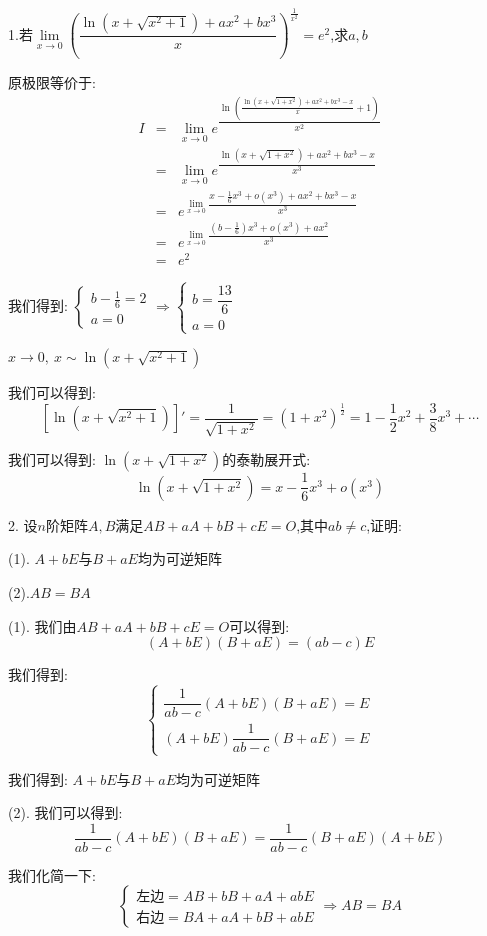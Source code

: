 1.若$\lim\limits_{x\rightarrow 0}\left(\dfrac{\ln(x+\sqrt{x^2+1})+ax^2+bx^3}{x} \right)^{\frac{1}{x^2}}=e^2$,求$a,b$
\begin{solution}
	
	原极限等价于: 
	\begin{eqnarray*}
		I&=&\lim\limits_{x\rightarrow 0}e^{\dfrac{\ln(\frac{\ln(x+\sqrt{1+x^2})+ax^2+bx^3-x}{x}+1)}{x^2}}\\
		&=&\lim\limits_{x\rightarrow 0}e^{\dfrac{\ln(x+\sqrt{1+x^2})+ax^2+bx^3-x}{x^3}}\\
		&=&e^{\lim\limits_{x\rightarrow 0}\dfrac{x-\frac{1}{6}x^3+o(x^3)+ax^2+bx^3-x}{x^3}}\\
		&=&e^{\lim\limits_{x\rightarrow 0}\dfrac{(b-\frac{1}{6})x^3+o(x^3)+ax^2}{x^3}}\\
		&=&e^2
	\end{eqnarray*}
	
	我们得到: $\left\lbrace
	\begin{array}{l}
		b-\frac{1}{6}=2\\
		a=0
	\end{array}
	\right. \Rightarrow \left\lbrace
	\begin{array}{l}
		b=\dfrac{13}{6}\\
		a=0
	\end{array}
	\right. $
\end{solution}
\begin{anymark}[注]
	$x\rightarrow 0,\ x\sim \ln(x+\sqrt{x^2+1})$
	
	我们可以得到: 
	$$[\ln(x+\sqrt{x^2+1})]'=\dfrac{1}{\sqrt{1+x^2}}=(1+x^2)^{\frac{1}{2}}=1-\dfrac{1}{2}x^2+\dfrac{3}{8}x^3+\cdots$$
	
	我们可以得到: $\ln(x+\sqrt{1+x^2})$的泰勒展开式: 
	$$\ln(x+\sqrt{1+x^2})=x-\dfrac{1}{6}x^3+o(x^3)$$
\end{anymark}

2. 设$n$阶矩阵$A,B$满足$AB+aA+bB+cE=O$,其中$ab\neq c$,证明: 

(1). $A+bE$与$B+aE$均为可逆矩阵 

(2).$AB=BA$
\begin{solution}
	
	(1). 我们由$AB+aA+bB+cE=O$可以得到: 
	$$(A+bE)(B+aE)=(ab-c)E$$
	
	我们得到: $$\left\lbrace
	\begin{array}{l}
		\dfrac{1}{ab-c}(A+bE)(B+aE)=E\\
		(A+bE)\dfrac{1}{ab-c}(B+aE)=E
	\end{array}
	\right. $$
	
	我们得到: $A+bE$与$B+aE$均为可逆矩阵 
	
	(2). 我们可以得到: 
	$$\dfrac{1}{ab-c}(A+bE)(B+aE)=\dfrac{1}{ab-c}(B+aE)(A+bE)$$
	
	我们化简一下: 
	$$\left\lbrace
	\begin{array}{l}
		\text{左边}=AB+bB+aA+abE\\
		\text{右边}=BA+aA+bB+abE
	\end{array}
	\right. \Rightarrow AB=BA$$
\end{solution}

